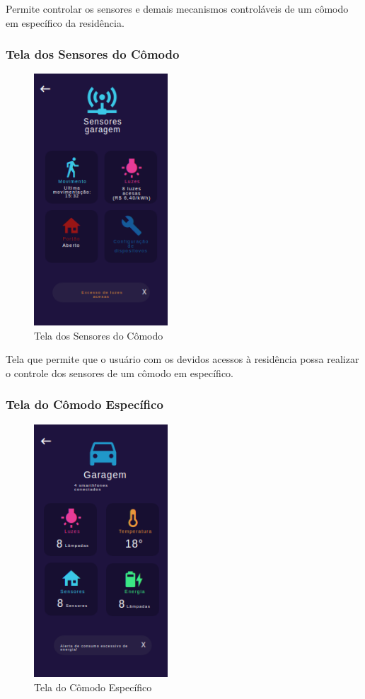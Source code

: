 \par Permite controlar os sensores e demais mecanismos controláveis de um cômodo em específico da residência.

\subsubsection{Tela dos Sensores do Cômodo}

\begin{figure}[!h]
\centering
\caption{Tela dos Sensores do Cômodo}
\includegraphics[width=5cm]{figuras/sensores_comodo}
\end{figure}

\par Tela que permite que o usuário com os devidos acessos à residência possa realizar o controle dos sensores de um cômodo em específico.

\subsubsection{Tela do Cômodo Específico}

\begin{figure}[!h]
\centering
\caption{Tela do Cômodo Específico}
\includegraphics[width=5cm]{figuras/comodo_especifico}
\end{figure}

